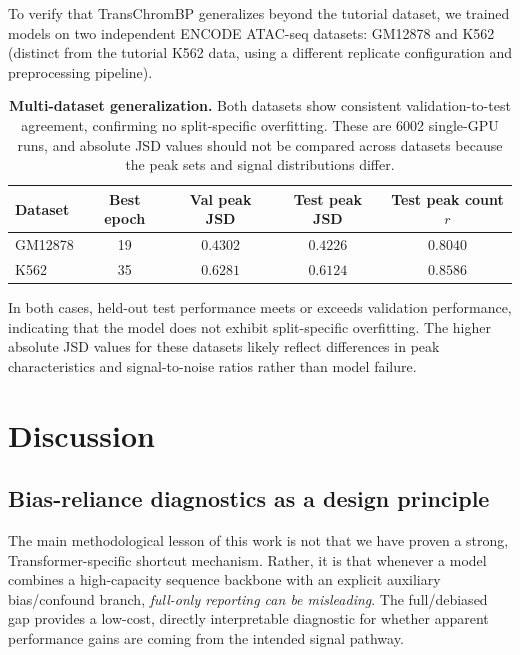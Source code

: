 \documentclass[11pt,a4paper]{article}
\begin{document}
To verify that TransChromBP generalizes beyond the tutorial dataset, we
trained models on two independent ENCODE ATAC-seq datasets: GM12878 and
K562 (distinct from the tutorial K562 data, using a different replicate
configuration and preprocessing pipeline).

\begin{table}[H]
\centering
\small
\caption{\textbf{Multi-dataset generalization.} Both datasets show
consistent validation-to-test agreement, confirming no split-specific
overfitting. These are 6002 single-GPU runs, and absolute JSD values
should not be compared across datasets because the peak sets and signal
distributions differ.}
\label{tab:multi-dataset}
\begin{tabular}{lcccc}
\toprule
Dataset & Best epoch & Val peak JSD & Test peak JSD & Test peak count $r$ \\
\midrule
GM12878 & 19 & $0.4302$ & $0.4226$ & $0.8040$ \\
K562 & 35 & $0.6281$ & $0.6124$ & $0.8586$ \\
\bottomrule
\end{tabular}
\end{table}

\noindent In both cases, held-out test performance meets or exceeds
validation performance, indicating that the model does not exhibit
split-specific overfitting. The higher absolute JSD values for these
datasets likely reflect differences in peak characteristics and
signal-to-noise ratios rather than model failure.

\section{Discussion}
\label{sec:discussion}

\subsection{Bias-reliance diagnostics as a design principle}

The main methodological lesson of this work is not that we have proven a
strong, Transformer-specific shortcut mechanism. Rather, it is that
whenever a model combines a high-capacity sequence backbone with an
explicit auxiliary bias/confound branch, \emph{full-only reporting can be
misleading}. The full/debiased gap provides a low-cost, directly
interpretable diagnostic for whether apparent performance gains are
coming from the intended signal pathway.
\end{document}

